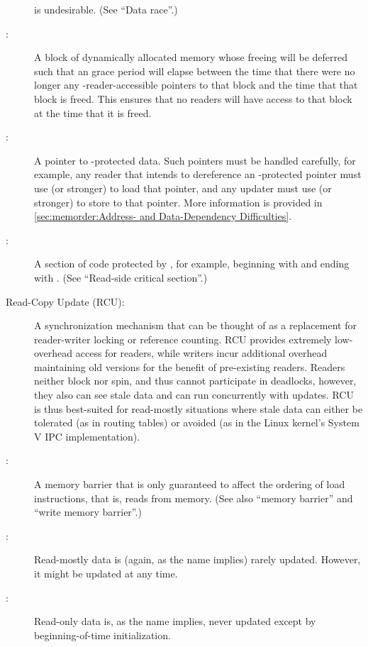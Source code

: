 \begin{description}
	is undesirable.
	(See ``Data race''.)
\item[\IXGaltr{RCU-Protected Data}{RCU-protected data}:]
	A block of dynamically allocated memory whose freeing will be
	deferred such that an  grace period will elapse between the
	time that there were no longer any -reader-accessible pointers
	to that block and the time that that block is freed.
	This ensures that no  readers will have access to that block at
	the time that it is freed.
\item[\IXGaltr{RCU-Protected Pointer}{RCU-protected pointer}:]
	A pointer to -protected data.
	Such pointers must be handled carefully, for example, any reader
	that intends to dereference an -protected pointer must
	use  (or stronger) to load that pointer,
	and any updater must use  (or stronger)
	to store to that pointer.
	More information is provided in
	\cref{sec:memorder:Address- and Data-Dependency Difficulties}.
\item[\IXGalthmr{RCU Read-Side Critical Section}{RCU read-side}{critical section}:]
	A section of code protected by , for example, beginning with
	 and ending with .
	(See ``Read-side critical section''.)
\item[Read-Copy Update (RCU):]
	A synchronization mechanism that can be thought of as a replacement
	for reader-writer locking or reference counting.
	RCU provides extremely low-overhead access for readers, while
	writers incur additional overhead maintaining old versions
	for the benefit of pre-existing readers.
	Readers neither block nor spin, and thus cannot participate in
	deadlocks, however, they also can see stale data and can
	run concurrently with updates.
	RCU is thus best-suited for read-mostly situations where
	stale data can either be tolerated (as in routing tables)
	or avoided (as in the Linux kernel's System V IPC implementation).
\item[\IXGh{Read}{Memory Barrier}:]
	A memory barrier that is only guaranteed to affect the ordering
	of load instructions, that is, reads from memory.
	(See also ``memory barrier'' and ``write memory barrier''.)
\item[\IXG{Read Mostly}:]
	Read-mostly data is (again, as the name implies) rarely updated.
	However, it might be updated at any time.
\item[\IXG{Read Only}:]
	Read-only data is, as the name implies, never updated except
	by beginning-of-time initialization.

\end{description}
